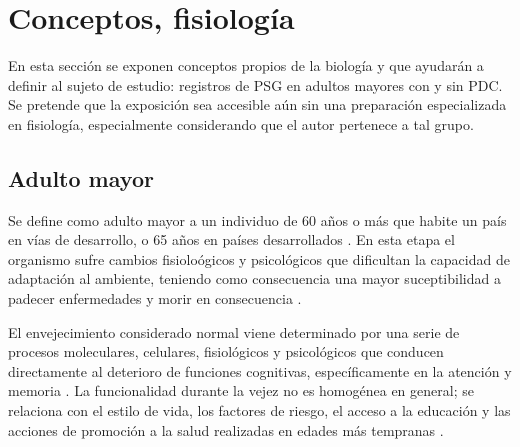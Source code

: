 \section{Conceptos, fisiolog\'ia}

En esta secci\'on se exponen conceptos propios de la biolog\'ia y que ayudar\'an a definir
al sujeto de estudio: registros de PSG en adultos mayores con y sin PDC.
Se pretende que la exposici\'on sea accesible a\'un sin una preparaci\'on 
especializada en fisiolog\'ia, especialmente considerando que el autor pertenece a tal grupo.


\subsection{Adulto mayor}

Se define como adulto mayor a un individuo de 60 a\~nos o m\'as que habite un pa\'is en v\'ias de
desarrollo, o 65 a\~nos en pa\'ises desarrollados \cite{Hita14}.
En esta etapa 
el organismo sufre cambios fisiolo\'ogicos y psicol\'ogicos que dificultan la capacidad de
adaptaci\'on al ambiente, teniendo como consecuencia una mayor suceptibilidad a padecer enfermedades
y morir en consecuencia \cite{Hita14}.



El envejecimiento considerado normal viene determinado por una serie de procesos moleculares, 
celulares, fisiol\'ogicos y psicol\'ogicos que conducen directamente al deterioro de funciones 
cognitivas, específicamente en la atenci\'on y memoria \cite{Navarrete03,Park09}.
La
funcionalidad durante la vejez no es homog\'enea
en general; se relaciona con el estilo de vida, los factores de riesgo, el acceso a la
educaci\'on y las acciones de promoci\'on a la salud realizadas en edades m\'as tempranas
\cite{Ohayon04,Sanhueza14}.


